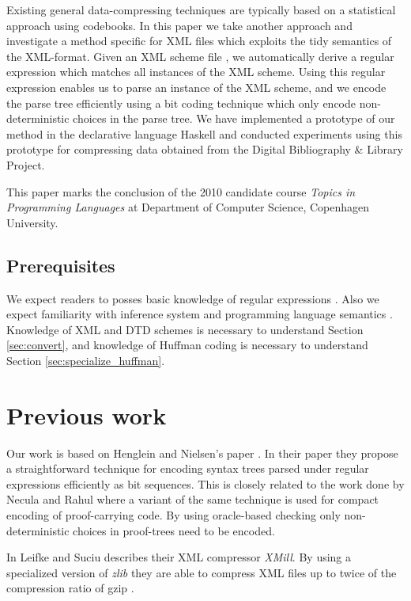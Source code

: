 \documentclass[a4paper, oneside]{memoir}
\theoremstyle{definition}
\begin{document}
Existing general data-compressing techniques are typically based on a
statistical approach using codebooks. In this paper we take another approach and
investigate a method specific for XML files which exploits the tidy semantics of
the XML-format. Given an XML scheme file \cite{wa2001}, we automatically derive
a regular expression which matches all instances of the XML scheme. Using this
regular expression enables us to parse an instance of the XML scheme, and we
encode the parse tree efficiently using a bit coding technique which only encode
non-deterministic choices in the parse tree. We have implemented a prototype of
our method in the declarative language Haskell \cite{sugost2008} and conducted
experiments using this prototype for compressing data obtained from the Digital
Bibliography \& Library Project.

This paper marks the conclusion of the 2010 candidate course \emph{Topics in
  Programming Languages} at Department of Computer Science, Copenhagen
University.

\subsection{Prerequisites}

We expect readers to posses basic knowledge of regular expressions \cite{houl2006}.
Also we expect familiarity with inference system and programming language semantics \cite{gu1992, wi1993}.
Knowledge of XML and DTD schemes is necessary to understand Section \ref{sec:convert},
and knowledge of Huffman coding \cite[Section 16.3]{co2001} is necessary to understand Section \ref{sec:specialize_huffman}.

\section{Previous work}

Our work is based on Henglein and Nielsen's paper \cite{heni2010}. In their
paper they propose a straightforward technique for encoding syntax trees parsed
under regular expressions efficiently as bit sequences. This is closely related
to the work done by Necula and Rahul \cite{nera2001} where a variant of the same
technique is used for compact encoding of proof-carrying code. By using
oracle-based checking only non-deterministic choices in proof-trees need to be
encoded.

In \cite{lisu2000} Leifke and Suciu describes their XML compressor
\emph{XMill}. By using a specialized version of \emph{zlib} \cite{dega1996} they
are able to compress XML files up to twice of the compression ratio of gzip
\cite{de1996}.
\end{document}
